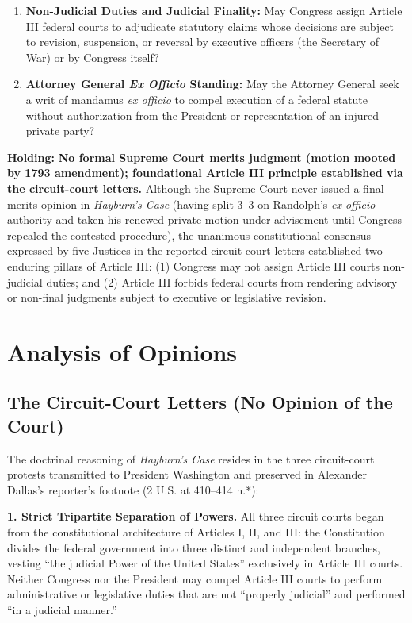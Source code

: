 \documentclass[12pt]{article}
\begin{document}
\begin{enumerate}
  \item \textbf{Non-Judicial Duties and Judicial Finality:} May Congress assign Article III federal courts to adjudicate statutory claims whose decisions are subject to revision, suspension, or reversal by executive officers (the Secretary of War) or by Congress itself?
  \item \textbf{Attorney General \textit{Ex Officio} Standing:} May the Attorney General seek a writ of mandamus \textit{ex officio} to compel execution of a federal statute without authorization from the President or representation of an injured private party?
\end{enumerate}

\textbf{Holding:} \textbf{No formal Supreme Court merits judgment (motion mooted by 1793 amendment); foundational Article III principle established via the circuit-court letters.} Although the Supreme Court never issued a final merits opinion in \textit{Hayburn's Case} (having split 3--3 on Randolph's \textit{ex officio} authority and taken his renewed private motion under advisement until Congress repealed the contested procedure), the unanimous constitutional consensus expressed by five Justices in the reported circuit-court letters established two enduring pillars of Article III: (1) Congress may not assign Article III courts non-judicial duties; and (2) Article III forbids federal courts from rendering advisory or non-final judgments subject to executive or legislative revision.

\section{Analysis of Opinions}
\subsection{The Circuit-Court Letters (No Opinion of the Court)}

The doctrinal reasoning of \textit{Hayburn's Case} resides in the three circuit-court protests transmitted to President Washington and preserved in Alexander Dallas's reporter's footnote (2 U.S. at 410--414 n.*):

\textbf{1. Strict Tripartite Separation of Powers.} All three circuit courts began from the constitutional architecture of Articles I, II, and III: the Constitution divides the federal government into three distinct and independent branches, vesting ``the judicial Power of the United States'' exclusively in Article III courts. Neither Congress nor the President may compel Article III courts to perform administrative or legislative duties that are not ``properly judicial'' and performed ``in a judicial manner.''
\end{document}
